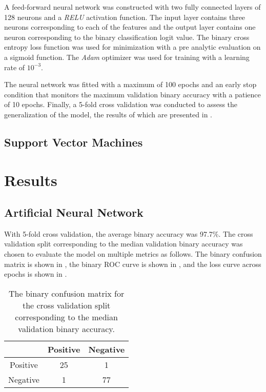 \documentclass[twocolumn]{article}
\begin{document}
A feed-forward neural network was constructed with two fully connected layers of
128 neurons and a \emph{RELU} activation function. The input layer contains
three neurons corresponding to each of the features and the output layer
contains one neuron corresponding to the binary classification logit value. The
binary cross entropy loss function was used for minimization with a pre analytic
evaluation on a sigmoid function. The \emph{Adam} optimizer was used for
training with a learning rate of $10^{-3}$.

The neural network was fitted with a maximum of 100 epochs and an early stop
condition that monitors the maximum validation binary accuracy with a patience
of 10 epochs. Finally, a 5-fold cross validation was conducted to assess the
generalization of the model, the results of which are presented in
.

\subsection{Support Vector Machines}

\section{Results}
\label{sec:Results}

\subsection{Artificial Neural Network}

With 5-fold cross validation, the average binary accuracy was 97.7\%. The
cross validation split corresponding to the median validation binary accuracy
was chosen to evaluate the model on multiple metrics as follows. The binary
confusion matrix is shown in , the binary
ROC curve is shown in , and the loss curve across
epochs is shown in .

\begin{table}
\begin{center}
\begin{tabular}{ccc}
\toprule
& Positive & Negative \\
\midrule
Positive & 25 & 1 \\
Negative & 1 & 77 \\
\bottomrule
\end{tabular}
\end{center}
\caption{The binary confusion matrix for the cross validation split
  corresponding to the median validation binary accuracy.}
\label{tab:NeuralNetworkConfusionMatrix}
\end{table}
\end{document}
